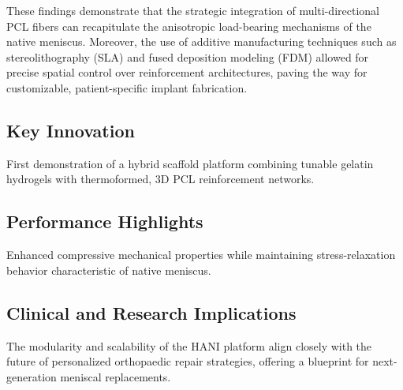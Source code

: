 These findings demonstrate that the strategic integration of multi-directional PCL fibers can recapitulate the anisotropic load-bearing mechanisms of the native meniscus. Moreover, the use of additive manufacturing techniques such as stereolithography (SLA) and fused deposition modeling (FDM) allowed for precise spatial control over reinforcement architectures, paving the way for customizable, patient-specific implant fabrication.

\subsection{Key Innovation}

First demonstration of a hybrid scaffold platform combining tunable gelatin hydrogels with thermoformed, 3D PCL reinforcement networks.

\subsection{Performance Highlights}

Enhanced compressive mechanical properties while maintaining stress-relaxation behavior characteristic of native meniscus.

\subsection{Clinical and Research Implications}

The modularity and scalability of the HANI platform align closely with the future of personalized orthopaedic repair strategies, offering a blueprint for next-generation meniscal replacements.




